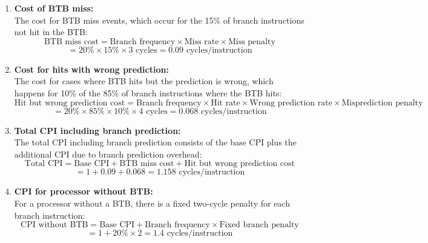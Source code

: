 \documentclass{article}
\begin{document}
\begin{enumerate}
  \item \textbf{Cost of BTB miss:} \\
  The cost for BTB miss events, which occur for the 15\% of branch instructions not hit in the BTB:
  \begin{equation*}
    \text{BTB miss cost} = \text{Branch frequency} \times \text{Miss rate} \times \text{Miss penalty}
  \end{equation*}
  \begin{equation*}
    = 20\% \times 15\% \times 3 \text{ cycles} = 0.09 \text{ cycles/instruction}
  \end{equation*}

  \item \textbf{Cost for hits with wrong prediction:} \\
  The cost for cases where BTB hits but the prediction is wrong, which happens for 10\% of the 85\% of branch instructions where the BTB hits:
  \begin{equation*}
    \text{Hit but wrong prediction cost} = \text{Branch frequency} \times \text{Hit rate} \times \text{Wrong prediction rate} \times \text{Misprediction penalty}
  \end{equation*}
  \begin{equation*}
    = 20\% \times 85\% \times 10\% \times 4 \text{ cycles} = 0.068 \text{ cycles/instruction}
  \end{equation*}

  \item \textbf{Total CPI including branch prediction:} \\
  The total CPI including branch prediction consists of the base CPI plus the additional CPI due to branch prediction overhead:
  \begin{equation*}
    \text{Total CPI} = \text{Base CPI} + \text{BTB miss cost} + \text{Hit but wrong prediction cost}
  \end{equation*}
  \begin{equation*}
    = 1 + 0.09 + 0.068 = 1.158 \text{ cycles/instruction}
  \end{equation*}

  \item \textbf{CPI for processor without BTB:} \\
  For a processor without a BTB, there is a fixed two-cycle penalty for each branch instruction:
  \begin{equation*}
    \text{CPI without BTB} = \text{Base CPI} + \text{Branch frequency} \times \text{Fixed branch penalty}
  \end{equation*}
  \begin{equation*}
    = 1 + 20\% \times 2 = 1.4 \text{ cycles/instruction}
  \end{equation*}


\end{enumerate}
\end{document}
